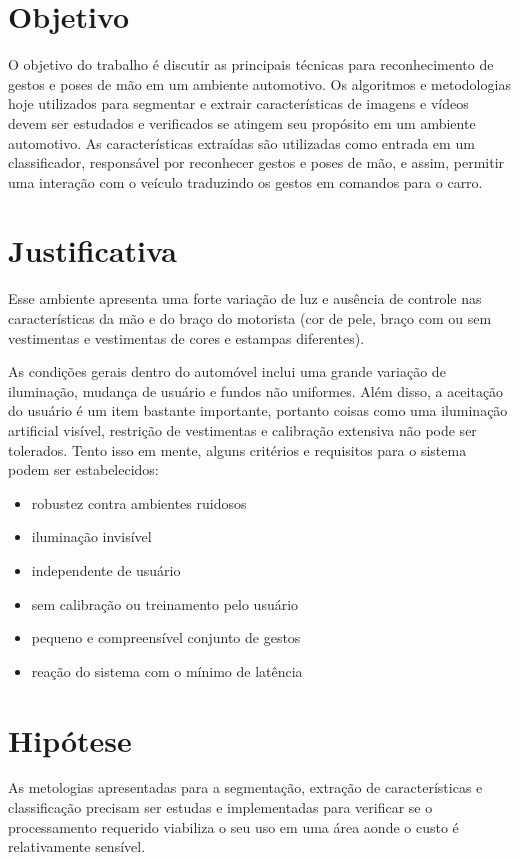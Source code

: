 \section{Objetivo}

O objetivo do trabalho é discutir as principais técnicas para reconhecimento de gestos e poses de mão em um ambiente automotivo.
Os algoritmos e metodologias hoje utilizados para segmentar e extrair características de imagens e vídeos devem ser estudados e verificados se atingem seu propósito em um ambiente automotivo.
As características extraídas são utilizadas como entrada em um classificador, responsável por reconhecer gestos e poses de mão, e assim, permitir uma interação com o veículo traduzindo os gestos em comandos para o carro.

\section{Justificativa}

Esse ambiente apresenta uma forte variação de luz e ausência de controle nas características da mão e do braço do motorista (cor de pele, braço com ou sem vestimentas e vestimentas de cores e estampas diferentes). 

As condições gerais dentro do automóvel inclui uma grande variação de iluminação, mudança de usuário e fundos não uniformes. Além disso, a aceitação do usuário é um item bastante importante, portanto coisas como uma iluminação artificial visível, restrição de vestimentas e calibração extensiva não pode ser tolerados. Tento isso em mente, alguns critérios e requisitos para o sistema podem ser estabelecidos:

\begin{itemize}
\item robustez contra ambientes ruidosos
\item iluminação invisível
\item independente de usuário
\item sem calibração ou treinamento pelo usuário
\item pequeno e compreensível conjunto de gestos
\item reação do sistema com o mínimo de latência
\end{itemize}

\section{Hipótese}

As metologias apresentadas para a segmentação, extração de características e classificação precisam ser estudas e implementadas para verificar se o processamento requerido viabiliza o seu uso em uma área aonde o custo é relativamente sensível.


